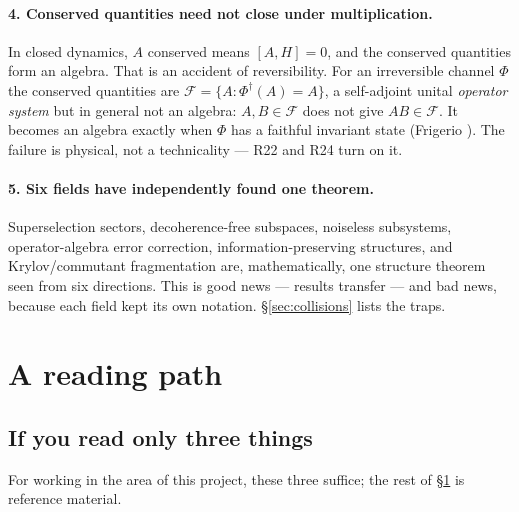 \documentclass[11pt]{article}
\newcommand{\Phid}{\Phi^{\dagger}}
\newcommand{\F}{\mathcal{F}}
\theoremstyle{plain}
\theoremstyle{remark}
\begin{document}
\paragraph{4. Conserved quantities need not close under multiplication.}
In closed dynamics, $A$ conserved means $[A,H]=0$, and the conserved quantities
form an algebra. That is an accident of reversibility. For an irreversible
channel $\Phi$ the conserved quantities are $\F = \{A : \Phid(A) = A\}$, a
self-adjoint unital \emph{operator system} but in general not an algebra:
$A, B \in \F$ does not give $AB \in \F$. It becomes an algebra exactly when
$\Phi$ has a faithful invariant state (Frigerio \cite{Frigerio1978}). The
failure is physical, not a technicality --- R22 and R24 turn on it.

\paragraph{5. Six fields have independently found one theorem.}
Superselection sectors, decoherence-free subspaces, noiseless subsystems,
operator-algebra error correction, information-preserving structures, and
Krylov/commutant fragmentation are, mathematically, one structure theorem seen
from six directions. This is good news --- results transfer --- and bad news,
because each field kept its own notation. \S\ref{sec:collisions} lists the
traps.

\section{A reading path}
\label{sec:path}

\subsection{If you read only three things}

For working in the area of this project, these three suffice; the rest of
\S\ref{sec:path} is reference material.
\end{document}
